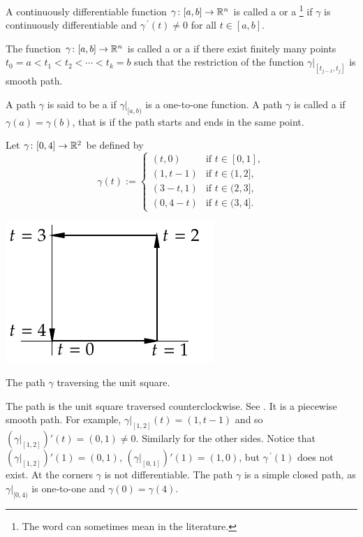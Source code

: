 \begin{defn}
A continuously differentiable function $\gamma \colon [a,b] \to {\mathbb{R}}^n$ is
called a \emph{}
or a
\emph{}\footnote{The
word  can sometimes mean
 in the literature.}
if
$\gamma$ is continuously differentiable and
$\gamma^{\:\prime}(t) \not= 0$ for all $t \in [a,b]$.

The function $\gamma \colon [a,b] \to {\mathbb{R}}^n$ is called a
\emph{} or a
\emph{}
if there exist finitely many points
$t_0 = a < t_1 < t_2 < \cdots < t_k = b$ such that
the restriction of the function $\gamma|_{[t_{j-1},t_j]}$ is smooth path.

A path $\gamma$ is said to be a \emph{} if $\gamma|_{[a,b)}$ is
a one-to-one function.  A path $\gamma$ is 
called
a \emph{} if $\gamma(a) = \gamma(b)$, that is
if the path starts and ends in the same point.
\end{defn}


\begin{example} \label{mv:example:unitsquarepath}
Let $\gamma \colon [0,4] \to {\mathbb{R}}^2$ be defined by
\begin{equation*}
\gamma(t) :=
\begin{cases}
(t,0)   & \text{if } t \in [0,1],\\
(1,t-1) & \text{if } t \in (1,2],\\
(3-t,1) & \text{if } t \in (2,3],\\
(0,4-t) & \text{if } t \in (3,4].
\end{cases}
\end{equation*}
\begin{myfigureht}
\includegraphics{figures/squarepath}
\caption{The path $\gamma$ traversing the unit square.\label{fig:squarepath}}
\end{myfigureht}

The path is the unit square traversed
counterclockwise.  See .  It is
a piecewise smooth path.  For example,
$\gamma|_{[1,2]}(t) = (1,t-1)$ and so
$(\gamma|_{[1,2]})'(t) = (0,1) \not= 0$.  Similarly for the other sides.
Notice
that
$(\gamma|_{[1,2]})'(1) = (0,1)$,
$(\gamma|_{[0,1]})'(1) = (1,0)$, but
$\gamma^{\:\prime}(1)$ does not exist.  At the corners $\gamma$ is 
not differentiable.
The path $\gamma$ is a simple closed path, as $\gamma|_{[0,4)}$ is
one-to-one and $\gamma(0)=\gamma(4)$.
\end{example}

